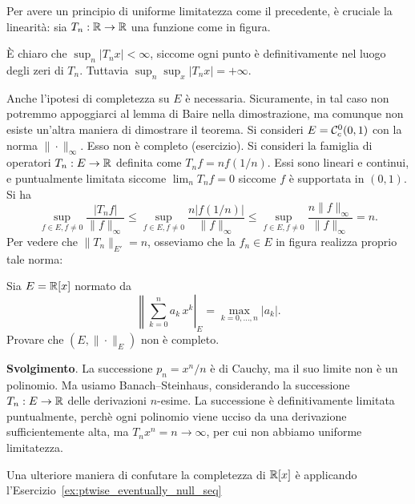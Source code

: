 \begin{counterexample}
	Per avere un principio di uniforme limitatezza come il precedente, è cruciale la linearità: sia $T_n:\mathbb{R} \to \mathbb{R}$ una funzione come in figura.

	\begin{figure}[H]
		\centering
	\end{figure}

	È chiaro che $\sup_n |T_n x| < \infty$, siccome ogni punto è definitivamente nel luogo degli zeri di $T_n$. Tuttavia $\sup_n \sup_x |T_n x| = + \infty$.
\end{counterexample}

\begin{counterexample}
	Anche l'ipotesi di completezza su $E$ è necessaria. Sicuramente, in tal caso non potremmo appoggiarci al lemma di Baire nella dimostrazione, ma comunque non esiste un'altra maniera di dimostrare il teorema.
	Si consideri $E = \mathcal{C}^0_c(0,1)$ con la norma $\|\cdot\|_\infty$. Esso non è completo (esercizio). Si consideri la famiglia di operatori $T_n : E \to \mathbb{R}$ definita come $T_nf = n f(1/n)$. Essi sono lineari e continui, e puntualmente limitata siccome $\lim_n T_n f = 0$ siccome $f$ è supportata in $(0,1)$. Si ha
	\begin{equation*}
		\sup_{f \in E, f \neq 0} \frac{|T_n f|}{\|f\|_\infty} \leq \sup_{f \in E, f \neq 0} \frac{n|f(1/n)|}{\|f\|_\infty} \leq \sup_{f \in E, f \neq 0} \frac{n\|f\|_\infty}{\|f\|_\infty} = n.
	\end{equation*}
	Per vedere che $\|T_n\|_{E'} = n$, osseviamo che la $f_n \in E$ in figura realizza proprio tale norma:

	\begin{figure}[H]
		\centering
	\end{figure}
\end{counterexample}

\begin{exercise}
	Sia $E = \mathbb{R}[x]$ normato da
	\begin{equation*}
		\left\|\sum_{k=0}^n a_k\,x^k\right|_E = \max_{k = 0, \ldots, n} |a_k|.
	\end{equation*}
	Provare che $(E, \|\cdot\|_E)$ non è completo.

	\textbf{Svolgimento}. La successione $p_n = x^n/n$ è di Cauchy, ma il suo limite non è un polinomio. Ma usiamo Banach--Steinhaus, considerando la successione $T_n : E \to \mathbb{R}$ delle derivazioni $n$-esime. La successione è definitivamente limitata puntualmente, perchè ogni polinomio viene ucciso da una derivazione sufficientemente alta, ma $T_n x^n = n \to \infty$, per cui non abbiamo uniforme limitatezza.

	Una ulteriore maniera di confutare la completezza di $\mathbb{R}[x]$ è applicando l'Esercizio~\ref{ex:ptwise_eventually_null_seq}
\end{exercise}

